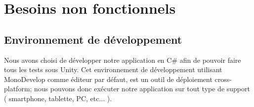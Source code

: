 \chapter{Besoins non fonctionnels}

\section{Environnement de développement}
Nous avons choisi de développer notre application en C\# afin de pouvoir faire tous les tests sous Unity. Cet environnement de développement utilisant MonoDevelop comme éditeur par défaut, est un outil de déploiement cross-platform; nous pouvons donc exécuter notre application sur tout type de support ( smartphone, tablette, PC, etc... ).


\clearpage
